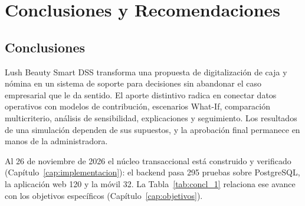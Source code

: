 \section{Conclusiones y Recomendaciones}\label{cap:conclusiones}

\subsection{Conclusiones}

Lush Beauty Smart DSS transforma una propuesta de digitalización de caja y nómina en un sistema de soporte para decisiones sin abandonar el caso empresarial que le da sentido. El aporte distintivo radica en conectar datos operativos con modelos de contribución, escenarios What-If, comparación multicriterio, análisis de sensibilidad, explicaciones y seguimiento. Los resultados de una simulación dependen de sus supuestos, y la aprobación final permanece en manos de la administradora.

Al 26 de noviembre de 2026 el núcleo transaccional está construido y verificado (Capítulo~\ref{cap:implementacion}): el backend pasa 295 pruebas sobre PostgreSQL, la aplicación web 120 y la móvil 32. La Tabla~\ref{tab:concl_1} relaciona ese avance con los objetivos específicos (Capítulo~\ref{cap:objetivos}).

